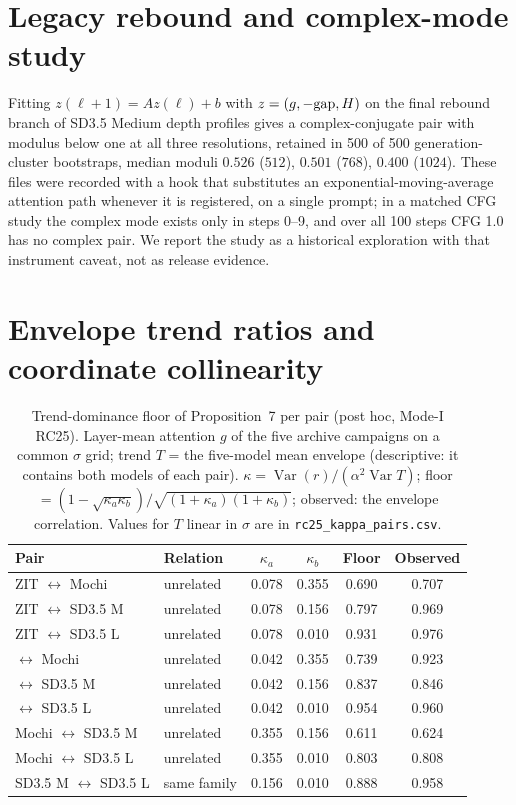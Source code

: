 \section{Legacy rebound and complex-mode study}\label{app:legacy}
Fitting $z(\ell+1)=Az(\ell)+b$ with $z=(g,-\mathrm{gap},H)$ on the final rebound branch of SD3.5 Medium depth profiles gives a complex-conjugate pair with modulus below one at all three resolutions, retained in 500 of 500 generation-cluster bootstraps, median moduli $0.526$ ($512$), $0.501$ ($768$), $0.400$ ($1024$). These files were recorded with a hook that substitutes an exponential-moving-average attention path whenever it is registered, on a single prompt; in a matched CFG study the complex mode exists only in steps 0--9, and over all 100 steps CFG 1.0 has no complex pair. We report the study as a historical exploration with that instrument caveat, not as release evidence.

\section{Envelope trend ratios and coordinate collinearity}\label{supp:kappa}
\begin{table}[htbp]
\centering\small
\caption{Trend-dominance floor of Proposition~7 per pair (post hoc, Mode-I RC25). Layer-mean attention $g$ of the five archive campaigns on a common $\sigma$ grid; trend $T$ = the five-model mean envelope (descriptive: it contains both models of each pair). $\kappa=\operatorname{Var}(r)/(\alpha^2\operatorname{Var}T)$; floor $=(1-\sqrt{\kappa_a\kappa_b})/\sqrt{(1+\kappa_a)(1+\kappa_b)}$; observed: the envelope correlation. Values for $T$ linear in $\sigma$ are in \texttt{rc25\_kappa\_pairs.csv}.}
\label{tab:kappa}
\begin{tabular}{llcccc}
\toprule
Pair & Relation & $\kappa_a$ & $\kappa_b$ & Floor & Observed\\
\midrule
ZIT $\leftrightarrow$ Mochi & unrelated & 0.078 & 0.355 & 0.690 & 0.707\\
ZIT $\leftrightarrow$ SD3.5 M & unrelated & 0.078 & 0.156 & 0.797 & 0.969\\
ZIT $\leftrightarrow$ SD3.5 L & unrelated & 0.078 & 0.010 & 0.931 & 0.976\\
\TT{} $\leftrightarrow$ Mochi & unrelated & 0.042 & 0.355 & 0.739 & 0.923\\
\TT{} $\leftrightarrow$ SD3.5 M & unrelated & 0.042 & 0.156 & 0.837 & 0.846\\
\TT{} $\leftrightarrow$ SD3.5 L & unrelated & 0.042 & 0.010 & 0.954 & 0.960\\
Mochi $\leftrightarrow$ SD3.5 M & unrelated & 0.355 & 0.156 & 0.611 & 0.624\\
Mochi $\leftrightarrow$ SD3.5 L & unrelated & 0.355 & 0.010 & 0.803 & 0.808\\
SD3.5 M $\leftrightarrow$ SD3.5 L & same family & 0.156 & 0.010 & 0.888 & 0.958\\
\bottomrule
\end{tabular}
\end{table}

